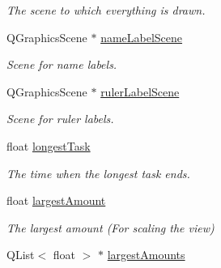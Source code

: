 \begin{DoxyCompactItemize}
\begin{DoxyCompactList}\small\item\em The scene to which everything is drawn. \end{DoxyCompactList}\item 
\hypertarget{class_main_window_a0661875b0e8d230abcaa746f68d56d24}{}Q\+Graphics\+Scene $\ast$ \hyperlink{class_main_window_a0661875b0e8d230abcaa746f68d56d24}{name\+Label\+Scene}\label{class_main_window_a0661875b0e8d230abcaa746f68d56d24}

\begin{DoxyCompactList}\small\item\em Scene for name labels. \end{DoxyCompactList}\item 
\hypertarget{class_main_window_a5a9dc81912a405ee0101ce6c6fd72cbc}{}Q\+Graphics\+Scene $\ast$ \hyperlink{class_main_window_a5a9dc81912a405ee0101ce6c6fd72cbc}{ruler\+Label\+Scene}\label{class_main_window_a5a9dc81912a405ee0101ce6c6fd72cbc}

\begin{DoxyCompactList}\small\item\em Scene for ruler labels. \end{DoxyCompactList}\item 
\hypertarget{class_main_window_a10467ff3d17d133dba6d758def5e51de}{}float \hyperlink{class_main_window_a10467ff3d17d133dba6d758def5e51de}{longest\+Task}\label{class_main_window_a10467ff3d17d133dba6d758def5e51de}

\begin{DoxyCompactList}\small\item\em The time when the longest task ends. \end{DoxyCompactList}\item 
\hypertarget{class_main_window_afaf2042d5708a2242bb7181cab07d55c}{}float \hyperlink{class_main_window_afaf2042d5708a2242bb7181cab07d55c}{largest\+Amount}\label{class_main_window_afaf2042d5708a2242bb7181cab07d55c}

\begin{DoxyCompactList}\small\item\em The largest amount (For scaling the view) \end{DoxyCompactList}\item 
\hypertarget{class_main_window_aa1b77bbae055203d9cf749c1dbb0ab40}{}Q\+List$<$ float $>$ $\ast$ \hyperlink{class_main_window_aa1b77bbae055203d9cf749c1dbb0ab40}{largest\+Amounts}\label{class_main_window_aa1b77bbae055203d9cf749c1dbb0ab40}


\end{DoxyCompactItemize}
